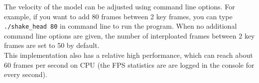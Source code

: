 \documentclass[acmtog]{acmart}
\begin{document}
The velocity of the model can be adjusted using command line options. For example, if you want to add 
80 frames between 2 key frames, you can type \texttt{./shake\_head 80} in command line to run the program. 
When no additional command line options are given, the number of interploated frames between 2 key frames 
are set to 50 by default.\\
This implementation also has a relative high performance, which can reach about 60 frames per second on CPU
(the FPS statistics are are logged in the console for every second). 
\end{document}
